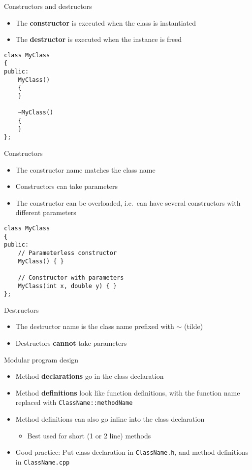 \begin{frame}[fragile]{Constructors and destructors}
    \begin{itemize}
        \item The \textbf{constructor} is executed when the class is instantiated
        \item The \textbf{destructor} is executed when the instance is freed
    \end{itemize}
	\begin{lstlisting}
class MyClass
{
public:
    MyClass()
    {
    }
    
    ~MyClass()
    {
    }
};
	\end{lstlisting}
\end{frame}

\begin{frame}[fragile]{Constructors}
    \begin{itemize}
        \item The constructor name matches the class name
        \item Constructors can take parameters
        \item The constructor can be overloaded, i.e.\ can have several constructors with different parameters
    \end{itemize}
	\begin{lstlisting}
class MyClass
{
public:
    // Parameterless constructor
    MyClass() { }
    
    // Constructor with parameters
    MyClass(int x, double y) { }
};
	\end{lstlisting}
\end{frame}

\begin{frame}[fragile]{Destructors}
    \begin{itemize}
        \item The destructor name is the class name prefixed with $\sim$ (tilde)
        \item Destructors \textbf{cannot} take parameters
    \end{itemize}
\end{frame}

\begin{frame}[fragile]{Modular program design}
    \begin{itemize}
        \item Method \textbf{declarations} go in the class declaration
        \item Method \textbf{definitions} look like function definitions,
            with the function name replaced with \lstinline{ClassName::methodName}
        \item Method definitions can also go inline into the class declaration
        \begin{itemize}
            \item Best used for short (1 or 2 line) methods
        \end{itemize}
        \item Good practice: Put class declaration in \texttt{ClassName.h}, and method definitions in \texttt{ClassName.cpp}
    \end{itemize}
\end{frame}

